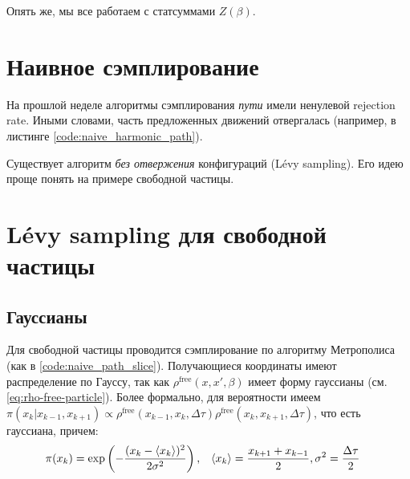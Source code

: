 \begin{lecture}
    Опять же, мы все работаем с статсуммами $Z(\beta)$.

    \section{Наивное сэмплирование}
    На прошлой неделе алгоритмы сэмплирования \textit{пути} имели ненулевой rejection rate.
    Иными словами, часть предложенных движений отвергалась (например, в листинге \ref{code:naive_harmonic_path}).


    Существует алгоритм \textit{без отвержения} конфигураций (Lévy sampling).
    Его идею проще понять на примере свободной частицы.

    \section{Lévy sampling для свободной частицы}
    \subsection{Гауссианы}

    Для свободной частицы проводится сэмплирование по алгоритму Метрополиса (как в \ref{code:naive_path_slice}).
    Получающиеся координаты имеют распределение по Гауссу, так как $\rho^{\text{free}} (x, x', \beta)$ имеет форму гауссианы (см. \eqref{eq:rho-free-particle}).
    Более формально, для вероятности имеем $\pi (x_k | x_{k-1}, x_{k+1}) \propto \rho^{\text{free}} (x_{k-1}, x_k, \Delta \tau) \rho^{\text{free}} (x_k, x_{k+1}, \Delta \tau)$, что есть гауссиана, причем:
    \begin{align}
        \label{eq:pi-x_k-when-k-fixed}
        & \pi (x_k) = \exp\left(- \frac{(x_k - \braket{x_k})^2}{2\sigma^2}\right),
        & \braket{x_k} = \frac{x_{k+1} + x_{k-1}}{2}, \, 
        & \sigma^2 = \frac{\Delta \tau}{2} 
    \end{align}


\end{lecture}
